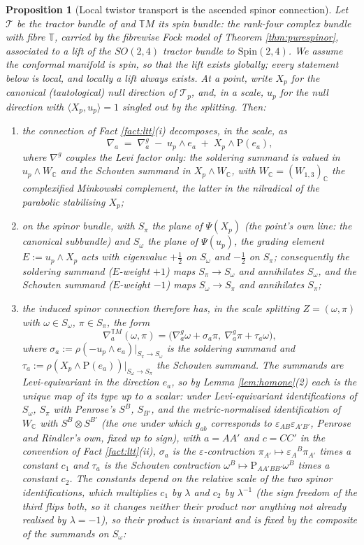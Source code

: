 \documentclass[11pt]{article}
\newtheorem{proposition}[theorem]{Proposition}
\theoremstyle{definition}
\newcommand{\C}{\mathbb{C}}
\newcommand{\T}{\mathbb{T}}
\newcommand{\ip}[2]{\langle #1, #2\rangle}
\newcommand{\Som}{S_\omega}
\newcommand{\Spi}{S_\pi}
\begin{document}
\begin{proposition}[Local twistor transport is the ascended spinor connection]\label{prop:localtwistor}
Let $\mathcal{T}$ be the tractor bundle of \cite[\S 4]{ButlerT6} and $\T M$ its spin bundle: the rank-four complex bundle with fibre $\T$, carried by the fibrewise Fock model of Theorem \ref{thm:purespinor}, associated to a lift of the $SO(2,4)$ tractor bundle to $\mathrm{Spin}(2,4)$. We assume the conformal manifold is spin, so that the lift exists globally; every statement below is local, and locally a lift always exists. At a point, write $X_p$ for the canonical (tautological) null direction of $\mathcal{T}_p$, and, in a scale, $u_p$ for the null direction with $\ip{X_p}{u_p} = 1$ singled out by the splitting. Then:
\begin{enumerate}
\item the connection of Fact \ref{fact:ltt}(i) decomposes, in the scale, as
\[
\nabla_a \;=\; \nabla^{g}_a \;-\; u_p \wedge e_a \;+\; X_p \wedge \mathrm{P}(e_a),
\]
where $\nabla^g$ couples the Levi factor only: the soldering summand is valued in $u_p\wedge W_\C$ and the Schouten summand in $X_p \wedge W_\C$, with $W_\C = (W_{1,3})_\C$ the complexified Minkowski complement, the latter in the nilradical of the parabolic stabilising $X_p$;
\item on the spinor bundle, with $\Spi$ the plane of $\Psi(X_p)$ (the point's own line: the canonical subbundle) and $\Som$ the plane of $\Psi(u_p)$, the grading element $E := u_p\wedge X_p$ acts with eigenvalue $+\tfrac12$ on $\Som$ and $-\tfrac12$ on $\Spi$; consequently the soldering summand ($E$-weight $+1$) maps $\Spi \to \Som$ and annihilates $\Som$, and the Schouten summand ($E$-weight $-1$) maps $\Som \to \Spi$ and annihilates $\Spi$;
\item the induced spinor connection therefore has, in the scale splitting $Z = (\omega, \pi)$ with $\omega \in \Som$, $\pi \in \Spi$, the form
\[
\nabla^{\T M}_a(\omega, \pi) = \bigl(\nabla^g_a\omega + \sigma_a\pi,\ \nabla^g_a\pi + \tau_a\omega\bigr),
\]
where $\sigma_a := \rho(-u_p\wedge e_a)|_{\Spi\to\Som}$ is the soldering summand and $\tau_a := \rho(X_p\wedge\mathrm{P}(e_a))|_{\Som\to\Spi}$ the Schouten summand.
The summands are Levi-equivariant in the direction $e_a$, so by Lemma \ref{lem:homone}(2) each is the unique map of its type up to a scalar: under Levi-equivariant identifications of $\Som$, $\Spi$ with Penrose's $S^B$, $S_{B'}$, and the \emph{metric-normalised} identification of $W_\C$ with $S^B\otimes S^{B'}$ (the one under which $g_{ab}$ corresponds to $\varepsilon_{AB}\varepsilon_{A'B'}$, Penrose and Rindler's own, fixed up to sign), with $a = AA'$ and $c = CC'$ in the convention of Fact \ref{fact:ltt}(ii), $\sigma_a$ is the $\varepsilon$-contraction $\pi_{A'} \mapsto \varepsilon_A{}^B\pi_{A'}$ times a constant $c_1$ and $\tau_a$ is the Schouten contraction $\omega^B \mapsto \mathrm{P}_{AA'BB'}\omega^B$ times a constant $c_2$. The constants depend on the relative scale of the two spinor identifications, which multiplies $c_1$ by $\lambda$ and $c_2$ by $\lambda^{-1}$ (the sign freedom of the third flips both, so it changes neither their product nor anything not already realised by $\lambda = -1$), so their product is invariant and is fixed by the composite of the summands on $\Som$:

\end{enumerate}
\end{proposition}
\end{document}

